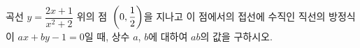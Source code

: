 곡선 $y=\dfrac{2x+1}{x^2+2}$ 위의 점~$\left(0{,}\mkern3mu\mathopen{}\dfrac{1}{2}\right)$을 지나고 이 점에서의 접선에 수직인 직선의 방정식이 $ax+by-1=0$일 때, 상수 $a$, $b$에 대하여 $ab$의 값을 구하시오.
